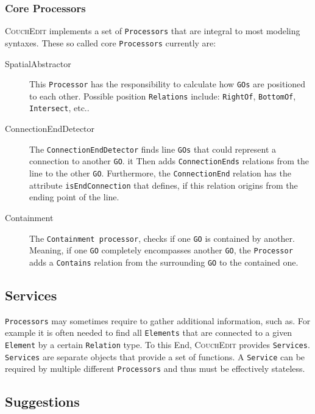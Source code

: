 \subsubsection{Core Processors}
\label{sec:core-processors}
\textsc{CouchEdit} implements a set of \texttt{Processors} that are integral to most modeling syntaxes. These so called core \texttt{Processors} currently are: 
\begin{description}
  \item[SpatialAbstractor] This \texttt{Processor} has the responsibility to calculate how \texttt{GOs} are positioned to each other. Possible position \texttt{Relations} include: \texttt{RightOf}, \texttt{BottomOf}, \texttt{Intersect}, etc..
  \item[ConnectionEndDetector] The \texttt{ConnectionEndDetector} finds line \texttt{GOs} that could represent a connection to another \texttt{GO}. it Then adds \texttt{ConnectionEnds} relations from the line to the other \texttt{GO}. Furthermore, the \texttt{ConnectionEnd} relation has the attribute \texttt{isEndConnection} that defines, if this relation origins from the ending point of the line.
  \item[Containment] The \texttt{Containment processor}, checks if one \texttt{GO} is contained by another. Meaning, if one \texttt{GO} completely encompasses another \texttt{GO}, the \texttt{Processor} adds a \texttt{Contains} relation from the surrounding \texttt{GO} to the contained one.
\end{description}

\subsection{Services}
\label{sec:services}
\texttt{Processors} may sometimes require to gather additional information, such as. For example it is often needed to find all \texttt{Elements} that are connected to a given \texttt{Element} by a certain \texttt{Relation} type.
To this End, \textsc{CouchEdit} provides \texttt{Services}. \texttt{Services} are separate objects that provide a set of functions. A \texttt{Service} can be required by multiple different \texttt{Processors} and thus must be effectively stateless.



\subsection{Suggestions}

